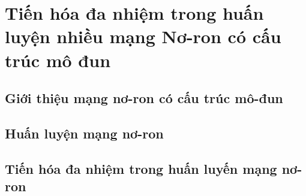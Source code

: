 \chapter{Tiến hóa đa nhiệm trong huấn luyện nhiều mạng Nơ-ron có cấu trúc mô đun}
\label{chap:problem}
\section{Giới thiệu mạng nơ-ron có cấu trúc mô-đun}

\newpage
\section{Huấn luyện mạng nơ-ron}

\newpage
\section{Tiến hóa đa nhiệm trong huấn luyến mạng nơ-ron}
